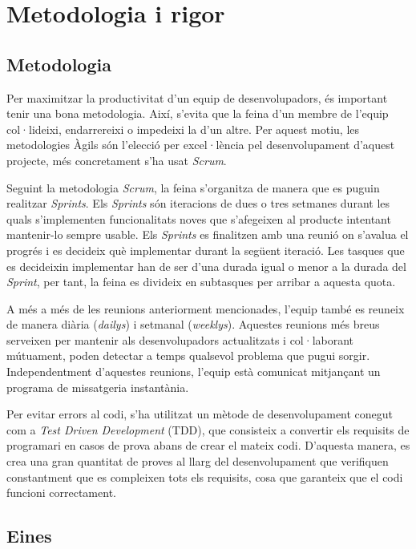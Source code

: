 \section{Metodologia i rigor}

\subsection{Metodologia}
Per maximitzar la productivitat d'un equip de desenvolupadors, és important tenir una bona metodologia. Així, s'evita que la feina d'un membre de l'equip col·lideixi, endarrereixi o impedeixi la d'un altre. Per aquest motiu, les metodologies Àgils són l'elecció per excel·lència pel desenvolupament d'aquest projecte, més concretament s'ha usat \textit{Scrum}.

Seguint la metodologia \textit{Scrum}, la feina s'organitza de manera que es puguin realitzar \textit{Sprints}. Els \textit{Sprints} són iteracions de dues o tres setmanes durant les quals s'implementen funcionalitats noves que s'afegeixen al producte intentant mantenir-lo sempre usable. Els \textit{Sprints} es finalitzen amb una reunió on s'avalua el progrés i es decideix què implementar durant la següent iteració. Les tasques que es decideixin implementar han de ser d'una durada igual o menor a la durada del \textit{Sprint}, per tant, la feina es divideix en subtasques per arribar a aquesta quota.

A més a més de les reunions anteriorment mencionades, l'equip també es reuneix de manera diària (\textit{dailys}) i setmanal (\textit{weeklys}). Aquestes reunions més breus serveixen per mantenir als desenvolupadors actualitzats i col·laborant mútuament, poden detectar a temps qualsevol problema que pugui sorgir. Independentment d'aquestes reunions, l'equip està comunicat mitjançant un programa de missatgeria instantània.

Per evitar errors al codi, s'ha utilitzat un mètode de desenvolupament conegut com a \textit{Test Driven Development} (TDD), que consisteix a convertir els requisits de programari en casos de prova abans de crear el mateix codi. D'aquesta manera, es crea una gran quantitat de proves al llarg del desenvolupament que verifiquen constantment que es compleixen tots els requisits, cosa que garanteix que el codi funcioni correctament.

\subsection{Eines}

